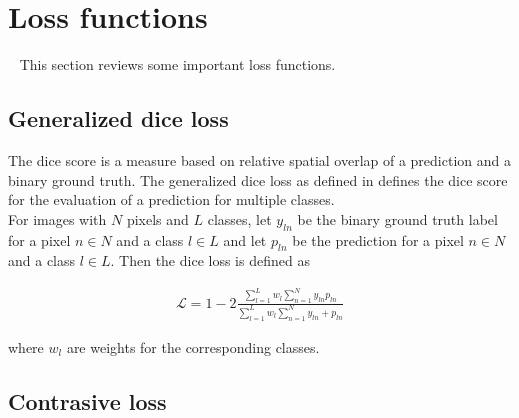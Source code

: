 \section{Loss functions}~\label{ssec:losses}
This section reviews some important loss functions.

\subsection{Generalized dice loss}\label{ssec:loss_dice}
The dice score is a measure based on relative spatial overlap of a prediction and a binary ground truth. The generalized dice loss as defined in \cite{Sudre_2017} defines the dice score for the evaluation of a prediction for multiple classes.\\
For images with $N$ pixels and $L$ classes, let $y_{ln}$ be the binary ground truth label for a pixel $n \in N$ and a class $l \in L$ and let $p_{ln}$ be the prediction for a pixel $n \in N$ and a class $l \in L$. Then the dice loss is defined as

\begin{align}
	\mathcal{L} = 1 - 2 \frac{\sum_{l=1}^L w_l \sum_{n=1}^N y_{ln} p_{ln}}{\sum_{l=1}^L w_l \sum_{n=1}^N y_{ln} + p_{ln}}
\end{align}

where $w_l$ are weights for the corresponding classes.

\subsection{Contrasive loss}\label{ssec:loss_contrastive}

